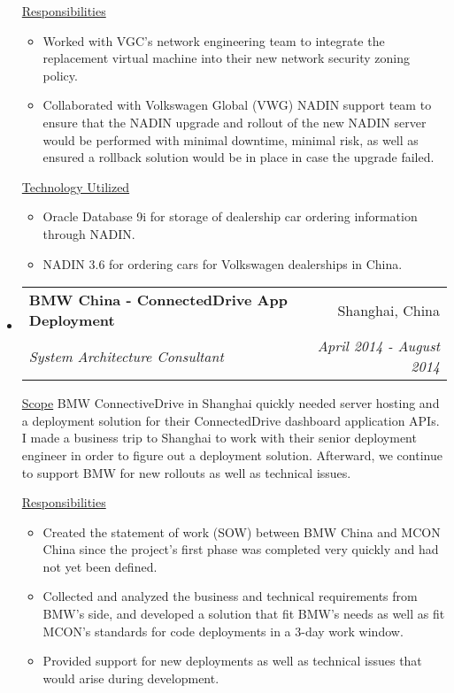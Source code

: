 \documentclass[a4paper,11pt]{article}
\makeatletter
\newcommand{\resitem}[1]{\item #1 \vspace{-2pt}}
\newcommand{\ressubheading}[4]{
\begin{tabular*}{6.5in}{l@{\cftdotfill{\cftsecdotsep}\extracolsep{\fill}}r}
        \textbf{#1} & #2 \\
        \textit{#3} & \textit{#4} \\
\end{tabular*}\vspace{-6pt}}
\makeatother
\begin{document}
\begin{itemize}
        \underline{Responsibilities}
        \begin{itemize}
            \resitem{Worked with VGC's network engineering team to integrate the replacement virtual machine into their new network security zoning policy.}
            \resitem{Collaborated with Volkswagen Global (VWG) NADIN support team to ensure that the NADIN upgrade and rollout of the new NADIN server would be performed with minimal downtime, minimal risk, as well as ensured a rollback solution would be in place in case the upgrade failed.}
        \end{itemize}

        \underline{Technology Utilized}
        \begin{itemize}
            \resitem{Oracle Database 9i for storage of dealership car ordering information through NADIN.}
            \resitem{NADIN 3.6 for ordering cars for Volkswagen dealerships in China.}
        \end{itemize}

    \item
        \ressubheading{BMW China - ConnectedDrive App Deployment}{Shanghai, China}{System Architecture Consultant}{April 2014 - August 2014}
        \linebreak
        \linebreak

        \underline{Scope}
        \linebreak
        \linebreak
        BMW ConnectiveDrive in Shanghai quickly needed server hosting and a deployment solution for their ConnectedDrive dashboard application APIs. I made a business trip to Shanghai to work with their senior deployment engineer in order to figure out a deployment solution. Afterward, we continue to support BMW for new rollouts as well as technical issues.

        \underline{Responsibilities}
        \begin{itemize}
            \resitem{Created the statement of work (SOW) between BMW China and MCON China since the project's first phase was completed very quickly and had not yet been defined.}
            \resitem{Collected and analyzed the business and technical requirements from BMW's side, and developed a solution that fit BMW's needs as well as fit MCON's standards for code deployments in a 3-day work window.}
            \resitem{Provided support for new deployments as well as technical issues that would arise during development.}
        \end{itemize}


\end{itemize}
\end{document}

